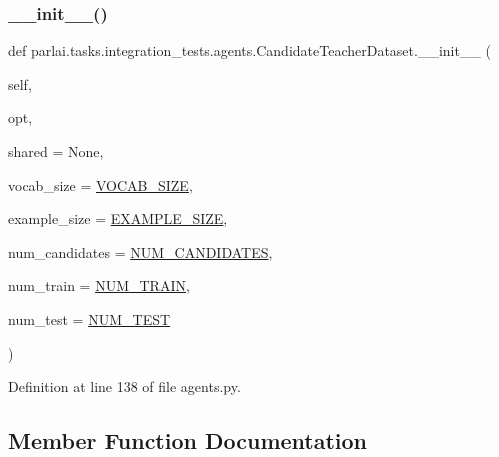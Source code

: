 \subsubsection{\texorpdfstring{\+\_\+\+\_\+init\+\_\+\+\_\+()}{\_\_init\_\_()}}
{\footnotesize\ttfamily def parlai.\+tasks.\+integration\+\_\+tests.\+agents.\+Candidate\+Teacher\+Dataset.\+\_\+\+\_\+init\+\_\+\+\_\+ (\begin{DoxyParamCaption}\item[{}]{self,  }\item[{}]{opt,  }\item[{}]{shared = {\ttfamily None},  }\item[{}]{vocab\+\_\+size = {\ttfamily \hyperlink{namespaceparlai_1_1tasks_1_1integration__tests_1_1agents_acce0481273f02014fb577733cfa8f2b7}{V\+O\+C\+A\+B\+\_\+\+S\+I\+ZE}},  }\item[{}]{example\+\_\+size = {\ttfamily \hyperlink{namespaceparlai_1_1tasks_1_1integration__tests_1_1agents_a1a9a556c90b625c74c9afd0a1a82ca3c}{E\+X\+A\+M\+P\+L\+E\+\_\+\+S\+I\+ZE}},  }\item[{}]{num\+\_\+candidates = {\ttfamily \hyperlink{namespaceparlai_1_1tasks_1_1integration__tests_1_1agents_a43719015a313515dcd768b12491ec3a1}{N\+U\+M\+\_\+\+C\+A\+N\+D\+I\+D\+A\+T\+ES}},  }\item[{}]{num\+\_\+train = {\ttfamily \hyperlink{namespaceparlai_1_1tasks_1_1integration__tests_1_1agents_abc5a5ed634c3ec4aa371a49b883d37a1}{N\+U\+M\+\_\+\+T\+R\+A\+IN}},  }\item[{}]{num\+\_\+test = {\ttfamily \hyperlink{namespaceparlai_1_1tasks_1_1integration__tests_1_1agents_ad6197fa4ad385bde5542da3aa644ad8b}{N\+U\+M\+\_\+\+T\+E\+ST}} }\end{DoxyParamCaption})}



Definition at line 138 of file agents.\+py.



\subsection{Member Function Documentation}
\mbox{\label{classparlai_1_1tasks_1_1integration__tests_1_1agents_1_1CandidateTeacherDataset_a3e2817bfd7fa0bafe5750156928968bc}} 
